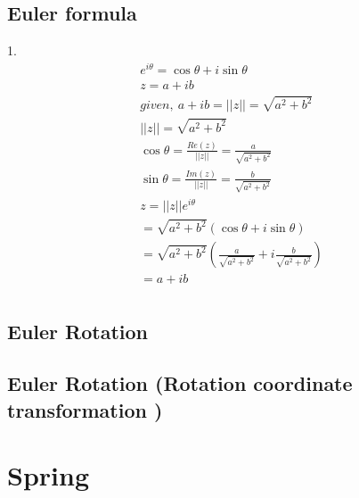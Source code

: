 \subsection{Euler formula}
	1.
	\begin{align}
		e^{i\theta} = \cos\theta+i\sin \theta \\
		z = a + ib \\
		given, \ a + ib = ||z||=\sqrt{a^2+b^2} \\
		||z|| = \sqrt{a^2+b^2}	 \\
		\cos \theta = \frac{Re(z)}{||z||} = \frac{a}{\sqrt{a^2+b^2}} \\
		\sin\theta = \frac{Im(z)}{||z||} = \frac{b }{\sqrt{a^2+b^2}} \\
		z = ||z|| e^{i\theta} \\
		= \sqrt{a^2+b^2}(\cos\theta+i\sin\theta) \\
		= \sqrt{a^2+b^2}(\frac{a}{\sqrt{a^2+b^2}}+i \frac{b}{\sqrt{a^2+b^2}}) \\
		= a + ib \\
 	\end{align}
 	
 	
 	
 	
\subsection{Euler Rotation}



\subsection{Euler Rotation (Rotation coordinate transformation )}
 	
 	
 \section{Spring}
 
 	

